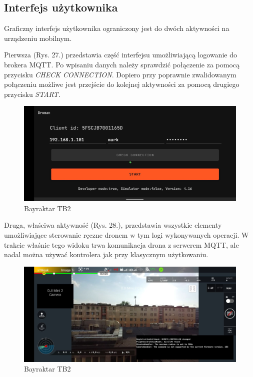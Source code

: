 \subsection{Interfejs użytkownika}
 Graficzny interfejs użytkownika ograniczony jest do dwóch aktywności na urządzeniu mobilnym. 
 
 Pierwsza (Rys. 27.) przedstawia część interfejsu umożliwiającą logowanie do brokera MQTT. Po wpisaniu danych należy sprawdzić połączenie za pomocą przycisku \textit{CHECK CONNECTION}. Dopiero przy poprawnie zwalidowanym połączeniu możliwe jest przejście do kolejnej aktywności za pomocą drugiego przycisku \textit{START}.

\begin{figure}[!ht]
  \centering
  \includegraphics[width=16cm]{./Obrazy/droman2.jpg}
  \caption{Bayraktar TB2}
  \end{figure}

Druga, właściwa aktywność (Rys. 28.), przedstawia wszystkie elementy umożliwiające sterowanie ręczne dronem w tym logi wykonywanych operacji. W trakcie właśnie tego widoku trwa komunikacja drona z serwerem MQTT, ale nadal można używać kontrolera jak przy klasycznym użytkowaniu.

\begin{figure}[!ht]
  \centering
  \includegraphics[width=14cm]{./Obrazy/droman1.jpg}
  \caption{Bayraktar TB2}
  \end{figure}
  
